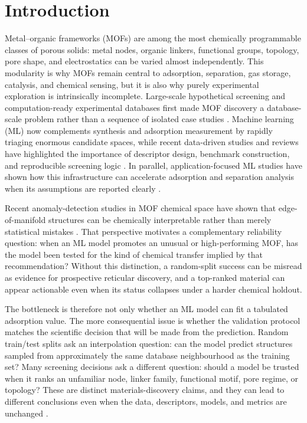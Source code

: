 \documentclass[11pt,a4paper]{article}
\begin{document}
\section*{Introduction}
Metal--organic frameworks (MOFs) are among the most chemically programmable classes of porous solids: metal nodes, organic linkers, functional groups, topology, pore shape, and electrostatics can be varied almost independently. This modularity is why MOFs remain central to adsorption, separation, gas storage, catalysis, and chemical sensing, but it is also why purely experimental exploration is intrinsically incomplete. Large-scale hypothetical screening and computation-ready experimental databases first made MOF discovery a database-scale problem rather than a sequence of isolated case studies \citep{Wilmer2012LargeScale,Chung2014CoREMOF,Chung2019CoRE2019}. Machine learning (ML) now complements synthesis and adsorption measurement by rapidly triaging enormous candidate spaces, while recent data-driven studies and reviews have highlighted the importance of descriptor design, benchmark construction, and reproducible screening logic \citep{Boyd2019DataDriven,Jablonka2020BigDataPorous,Moosavi2020RoleMLMaterials}. In parallel, application-focused ML studies have shown how this infrastructure can accelerate adsorption and separation analysis when its assumptions are reported clearly \citep{Altintas2021MLMOF,Shi2020HTCSMLMOF}.


Recent anomaly-detection studies in MOF chemical space have shown that edge-of-manifold structures can be chemically interpretable rather than merely statistical mistakes \citep{Alimardani2026CHEMAD}. That perspective motivates a complementary reliability question: when an ML model promotes an unusual or high-performing MOF, has the model been tested for the kind of chemical transfer implied by that recommendation? Without this distinction, a random-split success can be misread as evidence for prospective reticular discovery, and a top-ranked material can appear actionable even when its status collapses under a harder chemical holdout.

The bottleneck is therefore not only whether an ML model can fit a tabulated adsorption value. The more consequential issue is whether the validation protocol matches the scientific decision that will be made from the prediction. Random train/test splits ask an interpolation question: can the model predict structures sampled from approximately the same database neighbourhood as the training set? Many screening decisions ask a different question: should a model be trusted when it ranks an unfamiliar node, linker family, functional motif, pore regime, or topology? These are distinct materials-discovery claims, and they can lead to different conclusions even when the data, descriptors, models, and metrics are unchanged \citep{Fernandez2014MLCO2MOFs,Bucior2019EnergyDescriptors}.
\end{document}
